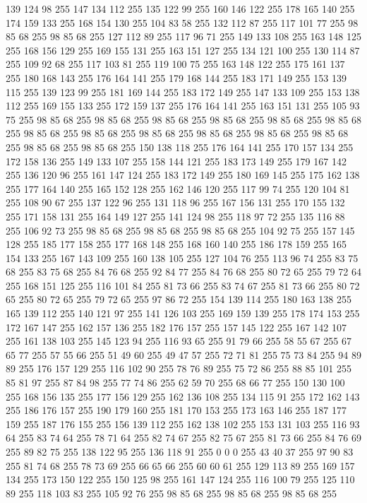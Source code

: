 139 124 98 255 147 134 112 255 135 122 99 255 160 146 122 255 178 165 140 255 174 159 133 255 168 154 130 255 104 83 58 255 132 112 87 255 117 101 77 255 98 85 68 255 98 85 68 255 127 112 89 255 117 96 71 255 149 133 108 255 163 148 125 255 168 156 129 255 169 155 131 255 163 151 127 255 134 121 100 255 130 114 87 255 109 92 68 255 117 103 81 255 119 100 75 255 163 148 122 255 175 161 137 255 180 168 143 255 176 164 141 255 179 168 144 255 183 171 149 255 153 139 115 255 139 123 99 255 181 169 144 255 183 172 149 255 147 133 109 255 153 138 112 255 169 155 133 255 172 159 137 255 176 164 141 255 163 151 131 255 105 93 75 255 98 85 68 255 98 85 68 255 98 85 68 255 98 85 68 255 98 85 68 255 98 85 68 255 98 85 68 255 98 85 68 255 98 85 68 255 98 85 68 255 98 85 68 255 98 85 68 255 98 85 68 255 98 85 68 255 150 138 118 255 176 164 141 255 170 157 134 255 172 158 136 255 149 133 107 255 158 144 121 255 183 173 149 255 179 167 142 255 136 120 96 255
161 147 124 255 183 172 149 255 180 169 145 255 175 162 138 255 177 164 140 255 165 152 128 255 162 146 120 255 117 99 74 255 120 104 81 255 108 90 67 255 137 122 96 255 131 118 96 255 167 156 131 255 170 155 132 255 171 158 131 255 164 149 127 255 141 124 98 255 118 97 72 255 135 116 88 255 106 92 73 255 98 85 68 255 98 85 68 255 98 85 68 255 104 92 75 255 157 145 128 255 185 177 158 255 177 168 148 255 168 160 140 255 186 178 159 255 165 154 133 255 167 143 109 255 160 138 105 255 127 104 76 255 113 96 74 255 83 75 68 255 83 75 68 255 84 76 68 255 92 84 77 255 84 76 68 255 80 72 65 255 79 72 64 255 168 151 125 255 116 101 84 255 81 73 66 255 83 74 67 255 81 73 66 255 80 72 65 255 80 72 65 255 79 72 65 255 97 86 72 255 154 139 114 255 180 163 138 255 165 139 112 255 140 121 97 255 141 126 103 255 169 159 139 255 178 174 153 255 172 167 147 255 162 157 136 255 182 176 157 255 157 145 122 255 167 142 107 255 161 138 103 255 145 123 94 255
116 93 65 255 91 79 66 255 58 55 67 255 67 65 77 255 57 55 66 255 51 49 60 255 49 47 57 255 72 71 81 255 75 73 84 255 94 89 89 255 176 157 129 255 116 102 90 255 78 76 89 255 75 72 86 255 88 85 101 255 85 81 97 255 87 84 98 255 77 74 86 255 62 59 70 255 68 66 77 255 150 130 100 255 168 156 135 255 177 156 129 255 162 136 108 255 134 115 91 255 172 162 143 255 186 176 157 255 190 179 160 255 181 170 153 255 173 163 146 255 187 177 159 255 187 176 155 255 156 139 112 255 162 138 102 255 153 131 103 255 116 93 64 255 83 74 64 255 78 71 64 255 82 74 67 255 82 75 67 255 81 73 66 255 84 76 69 255 89 82 75 255 138 122 95 255 136 118 91 255 0 0 0 255 43 40 37 255 97 90 83 255 81 74 68 255 78 73 69 255 66 65 66 255 60 60 61 255 129 113 89 255 169 157 134 255 173 150 122 255 150 125 98 255 161 147 124 255 116 100 79 255 125 110 89 255 118 103 83 255 105 92 76 255 98 85 68 255 98 85 68 255 98 85 68 255
